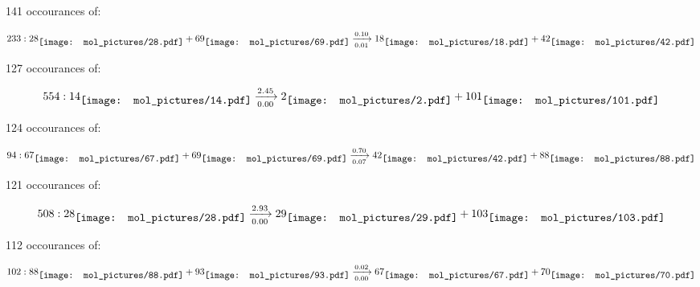 \documentclass{article}
\begin{document}
141 occourances of:

$$
233:  
28
\raisebox{-.5\height}{\texttt{[image: mol\_pictures/28.pdf]}}
+
69
\raisebox{-.5\height}{\texttt{[image: mol\_pictures/69.pdf]}}
\xrightarrow[0.01]{0.10}
18
\raisebox{-.5\height}{\texttt{[image: mol\_pictures/18.pdf]}}
+
42
\raisebox{-.5\height}{\texttt{[image: mol\_pictures/42.pdf]}}
$$



\vspace{1cm}


127 occourances of:

$$
554:  
14
\raisebox{-.5\height}{\texttt{[image: mol\_pictures/14.pdf]}}
\xrightarrow[0.00]{2.45}
2
\raisebox{-.5\height}{\texttt{[image: mol\_pictures/2.pdf]}}
+
101
\raisebox{-.5\height}{\texttt{[image: mol\_pictures/101.pdf]}}
$$



\vspace{1cm}


124 occourances of:

$$
94:  
67
\raisebox{-.5\height}{\texttt{[image: mol\_pictures/67.pdf]}}
+
69
\raisebox{-.5\height}{\texttt{[image: mol\_pictures/69.pdf]}}
\xrightarrow[0.07]{0.70}
42
\raisebox{-.5\height}{\texttt{[image: mol\_pictures/42.pdf]}}
+
88
\raisebox{-.5\height}{\texttt{[image: mol\_pictures/88.pdf]}}
$$



\vspace{1cm}


121 occourances of:

$$
508:  
28
\raisebox{-.5\height}{\texttt{[image: mol\_pictures/28.pdf]}}
\xrightarrow[0.00]{2.93}
29
\raisebox{-.5\height}{\texttt{[image: mol\_pictures/29.pdf]}}
+
103
\raisebox{-.5\height}{\texttt{[image: mol\_pictures/103.pdf]}}
$$



\vspace{1cm}


112 occourances of:

$$
102:  
88
\raisebox{-.5\height}{\texttt{[image: mol\_pictures/88.pdf]}}
+
93
\raisebox{-.5\height}{\texttt{[image: mol\_pictures/93.pdf]}}
\xrightarrow[0.00]{0.02}
67
\raisebox{-.5\height}{\texttt{[image: mol\_pictures/67.pdf]}}
+
70
\raisebox{-.5\height}{\texttt{[image: mol\_pictures/70.pdf]}}
$$
\end{document}
